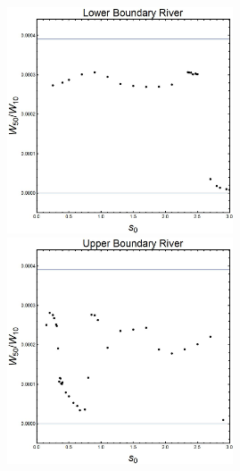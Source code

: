 ﻿\documentclass[12pt,a4paper]{article}
\begin{document}
\begin{figure}[H]
    \centering
   {{\includegraphics[width=6.7cm]{L50.jpg} }}
  {{\includegraphics[width=6.7cm]{U50.jpg} }}
\end{figure}
\end{document}
